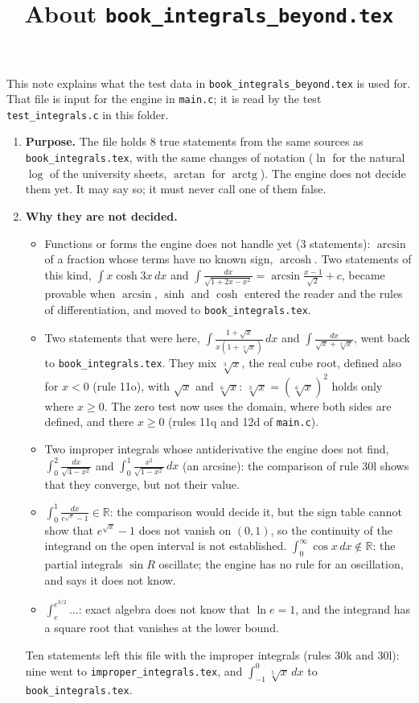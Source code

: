 \documentclass[11pt,a4paper]{article}
\title{About \texttt{book\_integrals\_beyond.tex}}
\author{}
\date{}
\begin{document}
\maketitle
This note explains what the test data in \texttt{book\_integrals\_beyond.tex} is used for. That file is input for the engine in \texttt{main.c}; it is read by the test \texttt{test\_integrals.c} in this folder.

\begin{enumerate}
\item \textbf{Purpose.} The file holds 8 true statements from the same sources as \texttt{book\_integrals.tex}, with the same changes of notation ($\ln$ for the natural $\log$ of the university sheets, $\arctan$ for $\operatorname{arctg}$). The engine does not decide them yet. It may say so; it must never call one of them false.

\item \textbf{Why they are not decided.}
\begin{itemize}
\item Functions or forms the engine does not handle yet (3 statements): $\arcsin$ of a fraction whose terms have no known sign, $\operatorname{arcosh}$. Two statements of this kind, $\int x \cosh 3x \, dx$ and $\int \frac{dx}{\sqrt{1 + 2x - x^{2}}} = \arcsin \frac{x - 1}{\sqrt{2}} + c$, became provable when $\arcsin$, $\sinh$ and $\cosh$ entered the reader and the rules of differentiation, and moved to \texttt{book\_integrals.tex}.
\item Two statements that were here, $\int \frac{1 + \sqrt{x}}{x(1 + \sqrt[3]{x})} \, dx$ and $\int \frac{dx}{\sqrt{x} + \sqrt[3]{x}}$, went back to \texttt{book\_integrals.tex}. They mix $\sqrt[3]{x}$, the real cube root, defined also for $x < 0$ (rule 11o), with $\sqrt{x}$ and $\sqrt[6]{x}$: $\sqrt[3]{x} = (\sqrt[6]{x})^{2}$ holds only where $x \ge 0$. The zero test now uses the domain, where both sides are defined, and there $x \ge 0$ (rules 11q and 12d of \texttt{main.c}).
\item Two improper integrals whose antiderivative the engine does not find, $\int_{0}^{2} \frac{dx}{\sqrt{4 - x^{2}}}$ and $\int_{0}^{1} \frac{x^{2}}{\sqrt{1 - x^{2}}} \, dx$ (an arcsine): the comparison of rule 30l shows that they converge, but not their value.
\item $\int_{0}^{1} \frac{dx}{e^{\sqrt{x}} - 1} \in \mathbb{R}$: the comparison would decide it, but the sign table cannot show that $e^{\sqrt{x}} - 1$ does not vanish on $(0, 1)$, so the continuity of the integrand on the open interval is not established. $\int_{0}^{\infty} \cos x \, dx \notin \mathbb{R}$: the partial integrals $\sin R$ oscillate; the engine has no rule for an oscillation, and says it does not know.
\item $\int_{e}^{e^{3/2}} \ldots$: exact algebra does not know that $\ln e = 1$, and the integrand has a square root that vanishes at the lower bound.
\end{itemize}
Ten statements left this file with the improper integrals (rules 30k and 30l): nine went to \texttt{improper\_integrals.tex}, and $\int_{-1}^{0} \sqrt[5]{x} \, dx$ to \texttt{book\_integrals.tex}.


\end{enumerate}
\end{document}

